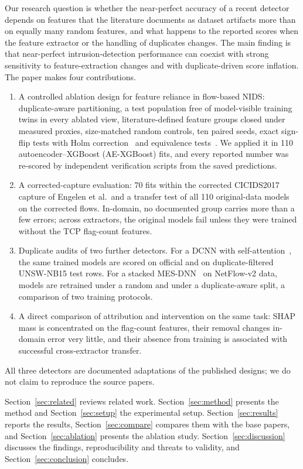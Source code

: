 \documentclass[journal]{IEEEtran}
\begin{document}
Our research question is whether the near-perfect accuracy of a recent detector depends on
features that the literature documents as dataset artifacts more than on equally many random
features, and what happens to the reported scores when the feature extractor or the handling of
duplicates changes. The main finding is that near-perfect intrusion-detection performance can
coexist with strong sensitivity to feature-extraction changes and with duplicate-driven score
inflation. The paper makes four contributions.
\begin{enumerate}
\item A controlled ablation design for feature reliance in flow-based NIDS: duplicate-aware
partitioning, a test population free of model-visible training twins in every ablated view,
literature-defined feature groups closed under measured proxies, size-matched random controls,
ten paired seeds, exact sign-flip tests with Holm correction~\cite{holm1979} and equivalence
tests~\cite{schuirmann1987}. We applied it in 110 autoencoder--XGBoost (AE-XGBoost) fits, and
every reported number was re-scored by independent verification scripts from the saved
predictions.
\item A corrected-capture evaluation: 70 fits within the corrected CICIDS2017 capture of Engelen
et al.\ and a transfer test of all 110 original-data models on the corrected flows. In-domain,
no documented group carries more than a few errors; across extractors, the original models fail
unless they were trained without the TCP flag-count features.
\item Duplicate audits of two further detectors. For a DCNN with self-attention~\cite{fang2026},
the same trained models are scored on official and on duplicate-filtered UNSW-NB15 test rows.
For a stacked MES-DNN~\cite{wardana2026} on NetFlow-v2 data, models are retrained under a random
and under a duplicate-aware split, a comparison of two training protocols.
\item A direct comparison of attribution and intervention on the same task: SHAP mass is
concentrated on the flag-count features, their removal changes in-domain error very little, and
their absence from training is associated with successful cross-extractor transfer.
\end{enumerate}
All three detectors are documented adaptations of the published designs; we do not claim to
reproduce the source papers.

Section~\ref{sec:related} reviews related work. Section~\ref{sec:method} presents the method and
Section~\ref{sec:setup} the experimental setup. Section~\ref{sec:results} reports the results,
Section~\ref{sec:compare} compares them with the base papers, and Section~\ref{sec:ablation}
presents the ablation study. Section~\ref{sec:discussion} discusses the findings, reproducibility
and threats to validity, and Section~\ref{sec:conclusion} concludes.
\end{document}
